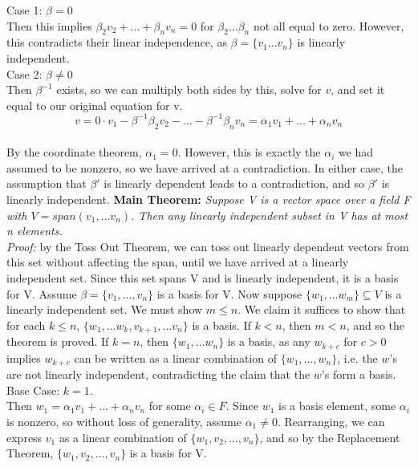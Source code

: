 \documentclass[12pt]{article}
\begin{document}
Case 1: $\beta = 0$\\
Then this implies $\beta_2 v_2 + \dots + \beta_n v_n = 0$ for $\beta_2 \dots \beta_n$ not all equal to zero. However, this contradicts their linear independence, as $\beta = \{ v_1 \dots v_n\}$ is linearly independent.\\

Case 2: $\beta \neq 0$\\
Then $\beta^{-1}$ exists, so we can multiply both sides by this, solve for $v$, and set it equal to our original equation for v.
$$v = 0 \cdot v_1 -\beta^{-1} \beta_2 v_2 - \dots - \beta^{-1} \beta_n v_n = \alpha_1 v_1 + \dots + \alpha_n v_n$$\\
By the coordinate theorem, $\alpha_1 = 0$. However, this is exactly the $\alpha_i$ we had assumed to be nonzero, so we have arrived at a contradiction. In either case, the assumption that $\beta'$ is linearly dependent leads to a contradiction, and so $\beta'$ is linearly independent.
\clearpage
\textbf{Main Theorem: }\emph{Suppose V is a vector space over a field F with $V = span(v_1,\dots v_n)$. Then any linearly independent subset in V has at most n elements.}\\

\emph{Proof: }by the Toss Out Theorem, we can toss out linearly dependent vectors from this set without affecting the span, until we have arrived at a linearly independent set. Since this set spans V and is linearly independent, it is a basis for V. Assume $\beta = \{ v_1, \dots, v_n \}$ is a basis for V. Now suppose $\{ w_1, \dots w_m \} \subseteq V$ is a linearly independent set. We must show $m \leq n$. We claim it suffices to show that for each $k \leq n$, $\{ w_1, \dots w_k, v_{k + 1}, \dots v_n \}$ is a basis. If $k < n$, then $m < n$, and so the theorem is proved. If $k = n$, then $\{ w_1, \dots w_n \}$ is a basis, as any $w_{k + c}$ for $c > 0$ implies $w_{k + c}$ can be written as a linear combination of $\{ w_1, \dots, w_n \}$, i.e. the $w$'s are not linearly independent, contradicting the claim that the $w$'s form a basis.\\

Base Case: $k = 1$.\\
Then $w_1 = \alpha_1 v_1 + \dots + \alpha_n v_n$ for some $\alpha_i \in F$. Since $w_1$ is a basis element, some $\alpha_i$ is nonzero, so without loss of generality, assume $\alpha_1 \neq 0$. Rearranging, we can express $v_1$ as a linear combination of $\{ w_1, v_2, \dots, v_n \}$, and so by the Replacement Theorem, $\{ w_1, v_2, \dots, v_n \}$ is a basis for V.\\
\end{document}
